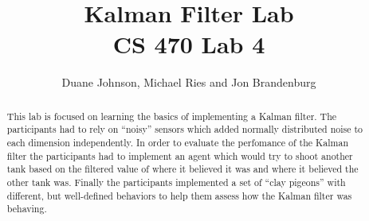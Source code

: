 \documentclass[letterpaper,12pt]{report}
\begin{document}
\title{Kalman Filter Lab \\
{\large \textbf{CS 470 Lab 4}}}
\author{Duane Johnson, Michael Ries and Jon Brandenburg}
\maketitle
\begin{abstract}
This lab is focused on learning the basics of implementing a Kalman filter.  The participants
had to rely on ``noisy'' sensors which added normally distributed noise to each dimension independently.
In order to evaluate the perfomance of the Kalman filter the participants had to implement an agent which would try to shoot
another tank based on the filtered value of where it believed it was and where it believed the other tank was.
Finally the participants implemented a set of ``clay pigeons'' with different, but well-defined behaviors to help them
assess how the Kalman filter was behaving.
\end{abstract}
\tableofcontents



%
\appendix

%
%
%
%
\end{document}
